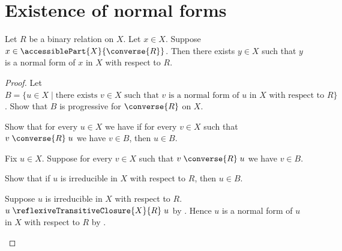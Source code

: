 


\section{Existence of normal forms}

\begin{theorem}\label{accessible_implies_normal_form}
    Let $R$ be a binary relation on $X$.
    Let $x\in X$.
    Suppose $x\in\accessiblePart{X}{\converse{R}}$.
    Then there exists $y\in X$ such that
        $y$ is a normal form of $x$ in $X$ with respect to $R$.
\end{theorem}
\begin{proof}
    Let $B=\{u\in X\mid\text{there exists $v\in X$ such that
        $v$ is a normal form of $u$ in $X$ with respect to $R$}\}$.
    Show that $B$ is progressive for $\converse{R}$ on $X$.
    \begin{subproof}
        Show that for every $u\in X$ we have if for every $v\in X$ such that
            $v\mathrel{\converse{R}}u$ we have $v\in B$, then $u\in B$.
        \begin{subproof}
            Fix $u\in X$.
            Suppose for every $v\in X$ such that
                $v\mathrel{\converse{R}}u$ we have $v\in B$.

            Show that if $u$ is irreducible in $X$ with respect to $R$,
                then $u\in B$.
            \begin{subproof}
                Suppose $u$ is irreducible in $X$ with respect to $R$.
                $u\mathrel{\reflexiveTransitiveClosure{X}{R}}u$
                    by .
                Hence $u$ is a normal form of $u$ in $X$ with respect to $R$
                    by .
            \end{subproof}


\end{subproof}
\end{subproof}
\end{proof}
